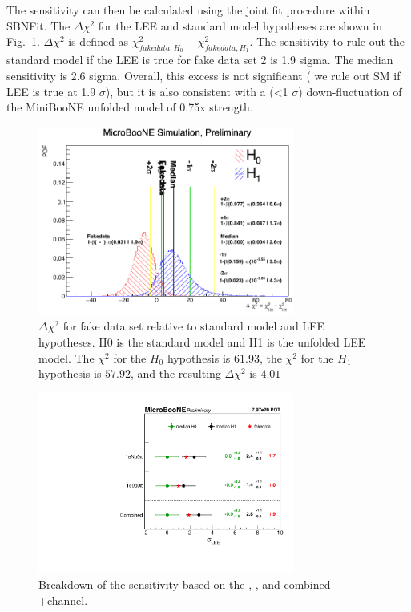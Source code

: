 The sensitivity can then be calculated using the joint fit procedure within SBNFit. The $\Delta \chi^{2}$ for the LEE and standard model hypotheses are shown in Fig.~\ref{fig:fakedata:set2:sens}.  $\Delta \chi^{2}$ is defined as $\chi^{2}_{fakedata, H_{0}}-\chi^{2}_{fakedata, H_{1}}$. The sensitivity to rule out the standard model if the LEE is true for fake data set 2 is 1.9 sigma.  The median sensitivity is 2.6 sigma. Overall, this excess is not significant ( we rule out SM if LEE is true at 1.9 $\sigma$), but it is also consistent with a (<1 $\sigma$) down-fluctuation of the MiniBooNE unfolded model of 0.75x strength.

\begin{figure}[H]
\begin{center}
\includegraphics[width=0.75\textwidth]{Fakedata/set2/sens.pdf}
\caption{\label{fig:fakedata:set2:sens} $\Delta \chi^{2}$ for fake data set relative to standard model and LEE hypotheses. H0 is the standard model and H1 is the unfolded LEE model. The $\chi^{2}$ for the $H_0$ hypothesis is $61.93$, the $\chi^{2}$ for the $H_1$ hypothesis is $57.92$, and the resulting $\Delta \chi^{2}$ is $4.01$}
\end{center}
\end{figure}

\begin{figure}[H]
\begin{center}
\includegraphics[width=0.75\textwidth]{Fakedata/set2/plotSig_constrained_set2.pdf}
\caption{\label{fig:fakedata:set2:combinedSig} Breakdown of the sensitivity based on the \npsel, \zpsel, and combined \npsel+\zpsel channel.}
\end{center}
\end{figure}

